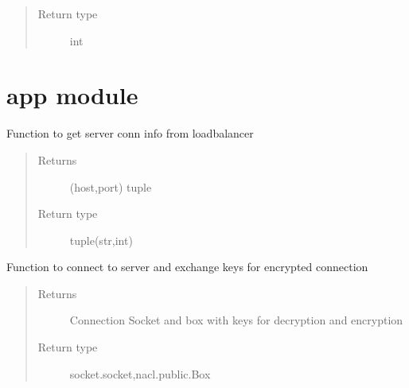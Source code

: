 \documentclass[letterpaper,10pt,english]{sphinxmanual}
\begin{document}
\begin{fulllineitems}
\begin{fulllineitems}
\begin{quote}
\begin{description}
\item[{Return type}] \leavevmode
int

\end{description}\end{quote}

\end{fulllineitems}


\end{fulllineitems}



\section{app module}
\label{\detokenize{app:module-app}}\label{\detokenize{app:app-module}}\label{\detokenize{app::doc}}

\begin{fulllineitems}
\label{\detokenize{app:app.getAddressToConnect}}
Function to get server conn info from loadbalancer
\begin{quote}\begin{description}
\item[{Returns}] \leavevmode
(host,port) tuple

\item[{Return type}] \leavevmode
tuple(str,int)

\end{description}\end{quote}

\end{fulllineitems}


\begin{fulllineitems}
\label{\detokenize{app:app.connectToServer}}
Function to connect to server and exchange keys for encrypted connection
\begin{quote}\begin{description}
\item[{Returns}] \leavevmode
Connection Socket and box with keys for decryption and encryption

\item[{Return type}] \leavevmode
socket.socket,nacl.public.Box

\end{description}\end{quote}

\end{fulllineitems}
\end{document}
